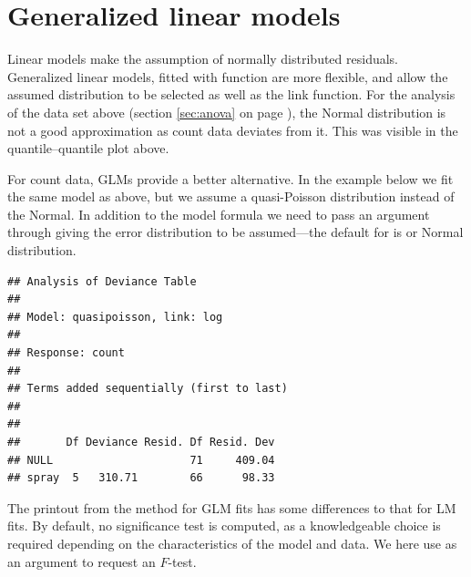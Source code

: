 \documentclass[krantz2]{krantz}\usepackage{knitr}
\begin{document}
\section{Generalized linear models}\label{sec:stat:GLM}

Linear models make the assumption of normally distributed residuals. Generalized linear models, fitted with function  are more flexible, and allow the assumed distribution to be selected as well as the link function.
For the analysis of the  data set above (section \ref{sec:anova} on page \pageref{sec:anova}), the Normal distribution is not a good approximation as count data deviates from it. This was visible in the quantile--quantile plot above.

For count data, GLMs provide a better alternative. In the example below we fit the same model as above, but we assume a quasi-Poisson distribution instead of the Normal. In addition to the model formula we need to pass an argument through  giving the error distribution to be assumed---the default for  is  or Normal distribution.

\begin{knitrout}\footnotesize
{}\color{fgcolor}\begin{kframe}
\begin{alltt}
 \hlkwb{<-}  \hlopt{~}     
\end{alltt}
\begin{verbatim}
## Analysis of Deviance Table
##
## Model: quasipoisson, link: log
##
## Response: count
##
## Terms added sequentially (first to last)
##
##
##       Df Deviance Resid. Df Resid. Dev
## NULL                     71     409.04
## spray  5   310.71        66      98.33
\end{verbatim}
\end{kframe}
\end{knitrout}

The printout from the  method for GLM fits has some differences to that for LM fits. By default, no significance test is computed, as a knowledgeable choice is required depending on the characteristics of the model and data. We here use  as an argument to request an $F$-test.
\end{document}
